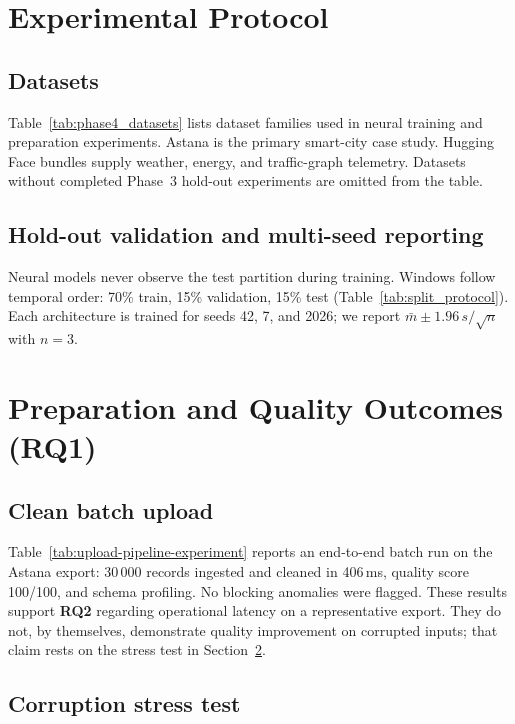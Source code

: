 \section{Experimental Protocol}
\label{sec:exp_protocol}

\subsection{Datasets}

Table~\ref{tab:phase4_datasets} lists dataset families used in neural training and preparation experiments. Astana is the primary smart-city case study. Hugging Face bundles supply weather, energy, and traffic-graph telemetry. Datasets without completed Phase~3 hold-out experiments are omitted from the table.



\subsection{Hold-out validation and multi-seed reporting}

Neural models never observe the test partition during training. Windows follow temporal order: 70\% train, 15\% validation, 15\% test (Table~\ref{tab:split_protocol}). Each architecture is trained for seeds 42, 7, and 2026; we report $\bar{m} \pm 1.96\, s/\sqrt{n}$ with $n=3$.



\section{Preparation and Quality Outcomes (RQ1)}
\label{sec:preparation_results}

\subsection{Clean batch upload}

Table~\ref{tab:upload-pipeline-experiment} reports an end-to-end batch run on the Astana export: 30\,000 records ingested and cleaned in 406\,ms, quality score 100/100, and schema profiling. No blocking anomalies were flagged. These results support \textbf{RQ2} regarding operational latency on a representative export. They do not, by themselves, demonstrate quality improvement on corrupted inputs; that claim rests on the stress test in Section~\ref{sec:preparation_results}.

\subsection{Corruption stress test}

